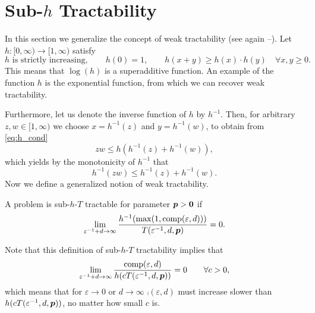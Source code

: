 \documentclass[sort&compress]{elsarticle}
\begin{document}




\section{Sub-$h$ Tractability}\label{sec:subh}
In this section we generalize the concept of weak tractability (see again \cite{NovWoz08a}--\cite{NovWoz12a}).  Let  $h:[0,\infty) \to [1,\infty)$ satisfy
\begin{equation} \label{eq:h_cond}
	h \text{ is strictly increasing}, \qquad
	h(0)=1, \qquad
 h(x+y) \ge  h(x)\cdot h(y)  \quad \forall x,y \ge 0.
\end{equation}
This means that $\log(h)$ is a superadditive function.  An example of the function $h$ is the exponential function, from which we can recover weak tractability.

Furthermore, let us denote the inverse function of $h$ by $h^{-1}$.
Then, for arbitrary $z,w \in [1,\infty)$ we choose $x=h^{-1}(z)$ and $y=h^{-1}(w)$, to obtain from \eqref{eq:h_cond}
\[
z w \le h (h^{-1}(z)+h^{-1}(w)),
\]
which yields by the monotonicity of $h^{-1}$ that
\begin{equation}\label{eq:submult_h_inverse}
h^{-1}(z w) \le h^{-1}(z)+h^{-1}(w).
\end{equation}
Now we define a generalized notion of weak tractability.
\begin{definition} \label{def:subhT}
	A problem is sub-$h$-$T$ tractable for parameter $\boldsymbol{p} > \boldsymbol{0}$ if
	\begin{equation*}
		\lim_{\varepsilon^{-1} + d \to \infty} \frac{h^{-1}(\max(1,\operatorname{comp}(\varepsilon,d)))}{T(\varepsilon^{-1},d,\boldsymbol{p})} = 0.
	\end{equation*}
\end{definition}

Note that this definition of sub-$h$-$T$ tractability implies that
\begin{equation} \label{eq:comp_slow_hcT}
		\lim_{\varepsilon^{-1} + d \to \infty} \frac{\operatorname{comp}(\varepsilon,d)}{h(cT(\varepsilon^{-1},d,\boldsymbol{p}))} = 0 \qquad \forall c > 0,
\end{equation}
which means that for $\varepsilon \to 0$ or $d \to \infty$  $\comp(\varepsilon,d)$ must increase slower than $h(cT(\varepsilon^{-1},d,\boldsymbol{p}))$, no matter how small $c$ is.
\end{document}
